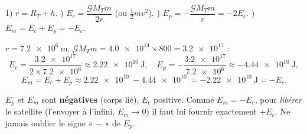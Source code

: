 \documentclass[11pt,a4paper]{article}
\begin{document}
\begin{methode}
1) $r=R_T+h$. ) $E_c=\dfrac{\mathcal{G}M_T m}{2r}$ (ou $\tfrac12 m v^2$). ) $E_p=-\dfrac{\mathcal{G}M_T m}{r}=-2E_c$. ) $E_m=E_c+E_p=-E_c$.
\end{methode}

\begin{exemplebox}
$r=\qty{7.2e6}{\metre}$, $\mathcal{G}M_T m=\num{4.0e14}\times 800=\num{3.2e17}$ :
\[
E_c=\frac{\num{3.2e17}}{2\times\num{7.2e6}}\approx\qty{2.22e10}{\joule},\quad
E_p=-\frac{\num{3.2e17}}{\num{7.2e6}}\approx-\qty{4.44e10}{\joule},
\]
\[
E_m=E_c+E_p\approx\qty{2.22e10}{}-\qty{4.44e10}{}=-\qty{2.22e10}{\joule}=-E_c.
\]
\end{exemplebox}

\begin{piege}
$E_p$ et $E_m$ sont \textbf{négatives} (corps lié), $E_c$ positive. Comme $E_m=-E_c$,
pour \emph{libérer} le satellite (l'envoyer à l'infini, $E_m\to 0$) il faut lui
fournir exactement $+E_c$. Ne jamais oublier le signe « $-$ » de $E_p$.
\end{piege}
\end{document}
